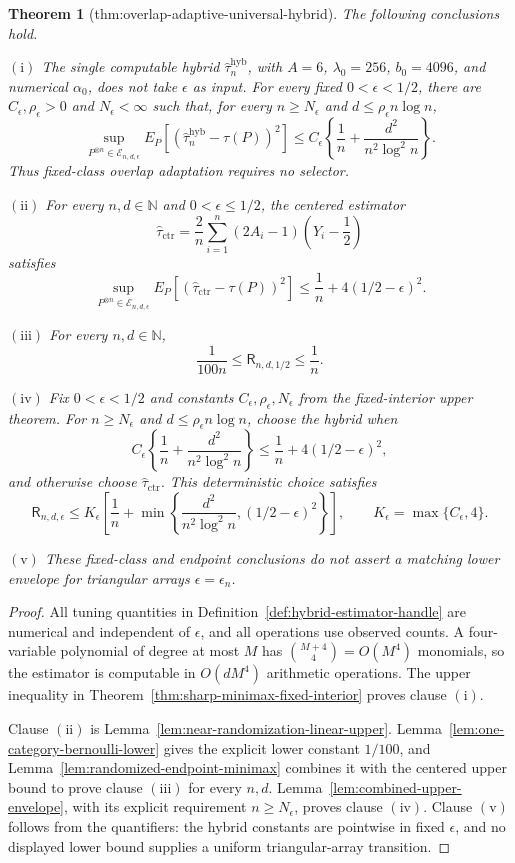 \documentclass{article}
\newtheorem{theorem}{Theorem}
\begin{document}
\begin{theorem}[thm:overlap-adaptive-universal-hybrid]\label{thm:overlap-adaptive-universal-hybrid}
The following conclusions hold.

\(\mathrm{(i)}\) The single computable hybrid \(\widehat\tau_n^{\mathrm{hyb}}\), with \(A=6\), \(\lambda_0=256\), \(b_0=4096\), and numerical \(\alpha_0\), does not take \(\epsilon\) as input. For every fixed \(0<\epsilon<1/2\), there are \(C_\epsilon,\rho_\epsilon>0\) and \(N_\epsilon<\infty\) such that, for every \(n\ge N_\epsilon\) and \(d\le\rho_\epsilon n\log n\),
\[
\sup_{P^{\otimes n}\in\mathcal E_{n,d,\epsilon}}E_P[(\widehat\tau_n^{\mathrm{hyb}}-\tau(P))^2]\le C_\epsilon\left\{\frac1n+\frac{d^2}{n^2\log^2n}\right\}.
\]
Thus fixed-class overlap adaptation requires no selector.

\(\mathrm{(ii)}\) For every \(n,d\in\mathbb N\) and \(0<\epsilon\le1/2\), the centered estimator
\[
\widehat\tau_{\mathrm{ctr}}=\frac2n\sum_{i=1}^n(2A_i-1)\left(Y_i-\frac12\right)
\]
satisfies
\[
\sup_{P^{\otimes n}\in\mathcal E_{n,d,\epsilon}}E_P[(\widehat\tau_{\mathrm{ctr}}-\tau(P))^2]\le\frac1n+4(1/2-\epsilon)^2.
\]

\(\mathrm{(iii)}\) For every \(n,d\in\mathbb N\),
\[
\frac{1}{100n}\le\mathsf R_{n,d,1/2}\le\frac1n.
\]

\(\mathrm{(iv)}\) Fix \(0<\epsilon<1/2\) and constants \(C_\epsilon,\rho_\epsilon,N_\epsilon\) from the fixed-interior upper theorem. For \(n\ge N_\epsilon\) and \(d\le\rho_\epsilon n\log n\), choose the hybrid when
\[
C_\epsilon\left\{\frac1n+\frac{d^2}{n^2\log^2n}\right\}\le\frac1n+4(1/2-\epsilon)^2,
\]
and otherwise choose \(\widehat\tau_{\mathrm{ctr}}\). This deterministic choice satisfies
\[
\mathsf R_{n,d,\epsilon}\le K_\epsilon\left[\frac1n+\min\left\{\frac{d^2}{n^2\log^2n},(1/2-\epsilon)^2\right\}\right],\qquad K_\epsilon=\max\{C_\epsilon,4\}.
\]

\(\mathrm{(v)}\) These fixed-class and endpoint conclusions do not assert a matching lower envelope for triangular arrays \(\epsilon=\epsilon_n\).
\end{theorem}
\begin{proof}
All tuning quantities in Definition~\ref{def:hybrid-estimator-handle} are numerical and independent of \(\epsilon\), and all operations use observed counts. A four-variable polynomial of degree at most \(M\) has \(\binom{M+4}{4}=O(M^4)\) monomials, so the estimator is computable in \(O(dM^4)\) arithmetic operations. The upper inequality in Theorem~\ref{thm:sharp-minimax-fixed-interior} proves clause \(\mathrm{(i)}\).

Clause \(\mathrm{(ii)}\) is Lemma~\ref{lem:near-randomization-linear-upper}. Lemma~\ref{lem:one-category-bernoulli-lower} gives the explicit lower constant \(1/100\), and Lemma~\ref{lem:randomized-endpoint-minimax} combines it with the centered upper bound to prove clause \(\mathrm{(iii)}\) for every \(n,d\). Lemma~\ref{lem:combined-upper-envelope}, with its explicit requirement \(n\ge N_\epsilon\), proves clause \(\mathrm{(iv)}\). Clause \(\mathrm{(v)}\) follows from the quantifiers: the hybrid constants are pointwise in fixed \(\epsilon\), and no displayed lower bound supplies a uniform triangular-array transition.
\end{proof}
\end{document}
